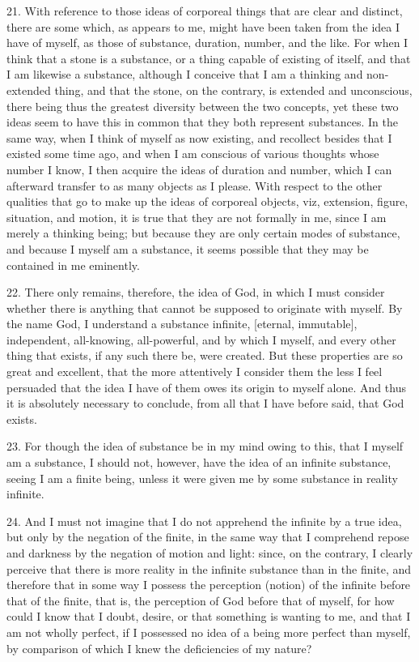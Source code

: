 21. With reference to those ideas of corporeal things that are clear and distinct, there are some which, as appears to me, might have been taken from the idea I have of myself, as those of substance, duration, number, and the like. For when I think that a stone is a substance, or a thing capable of existing of itself, and that I am likewise a substance, although I conceive that I am a thinking and non-extended thing, and that the stone, on the contrary, is extended and unconscious, there being thus the greatest diversity between the two concepts, yet these two ideas seem to have this in common that they both represent substances. In the same way, when I think of myself as now existing, and recollect besides that I existed some time ago, and when I am conscious of various thoughts whose number I know, I then acquire the ideas of duration and number, which I can afterward transfer to as many objects as I please. With respect to the other qualities that go to make up the ideas of corporeal objects, viz, extension, figure, situation, and motion, it is true that they are not formally in me, since I am merely a thinking being; but because they are only certain modes of substance, and because I myself am a substance, it seems possible that they may be contained in me eminently.

22. There only remains, therefore, the idea of God, in which I must consider whether there is anything that cannot be supposed to originate with myself. By the name God, I understand a substance infinite, [eternal, immutable], independent, all-knowing, all-powerful, and by which I myself, and every other thing that exists, if any such there be, were created. But these properties are so great and excellent, that the more attentively I consider them the less I feel persuaded that the idea I have of them owes its origin to myself alone. And thus it is absolutely necessary to conclude, from all that I have before said, that God exists.

23. For though the idea of substance be in my mind owing to this, that I myself am a substance, I should not, however, have the idea of an infinite substance, seeing I am a finite being, unless it were given me by some substance in reality infinite.

24. And I must not imagine that I do not apprehend the infinite by a true idea, but only by the negation of the finite, in the same way that I comprehend repose and darkness by the negation of motion and light: since, on the contrary, I clearly perceive that there is more reality in the infinite substance than in the finite, and therefore that in some way I possess the perception (notion) of the infinite before that of the finite, that is, the perception of God before that of myself, for how could I know that I doubt, desire, or that something is wanting to me, and that I am not wholly perfect, if I possessed no idea of a being more perfect than myself, by comparison of which I knew the deficiencies of my nature?

